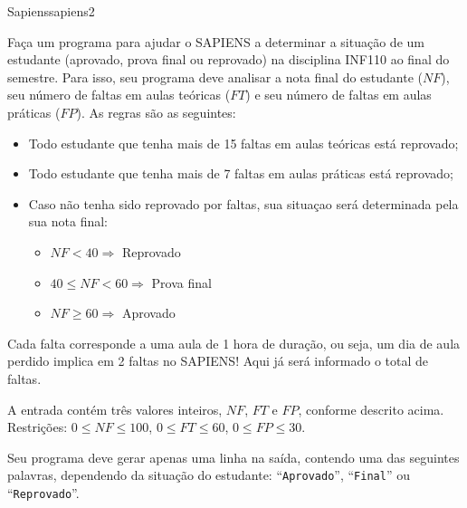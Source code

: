 \documentclass[12pt,a4paper,oneside]{article}
\begin{document}
\begin{problem}{Sapiens}{sapiens}{2}
 
Faça um programa para ajudar o SAPIENS a determinar a situação de um estudante (aprovado, prova final ou reprovado) na disciplina INF110 ao final do semestre. Para isso, seu programa deve analisar a nota final do estudante ($NF$), seu número de faltas em aulas teóricas ($FT$) e seu número de faltas em aulas práticas ($FP$). As regras são as seguintes:

\begin{itemize}
    \item Todo estudante que tenha mais de 15 faltas em aulas teóricas está reprovado;
    \item Todo estudante que tenha mais de 7 faltas em aulas práticas está reprovado;
    \item Caso não tenha sido reprovado por faltas, sua situaçao será determinada pela sua nota final:
    \begin{itemize}
        \item $NF < 40 \Rightarrow$ Reprovado
        \item $40 \leq NF < 60 \Rightarrow$ Prova final
        \item $NF \geq 60 \Rightarrow$ Aprovado
    \end{itemize}
\end{itemize}

\Notes
%
Cada falta corresponde a uma aula de 1 hora de duração, ou seja, um dia de aula perdido implica em 2 faltas no SAPIENS! Aqui já será informado o total de faltas.


\InputFile

A entrada contém três valores inteiros, $NF$, $FT$ e $FP$, conforme descrito acima. Restrições: $0 \leq NF \leq 100$, $0 \leq FT \leq 60$, $0 \leq FP \leq 30$.



\OutputFile

Seu programa deve gerar apenas uma linha na saída, contendo uma das seguintes palavras, dependendo da situação do estudante: ``\texttt{Aprovado}'', ``\texttt{Final}'' ou ``\texttt{Reprovado}''.

\Example

\begin{example}
%
\end{example}


\begin{example}
%
\end{example}

\begin{example}
%
\end{example}

\begin{example}
%
\end{example}



\end{problem}
\end{document}
